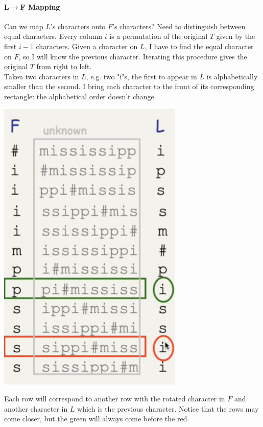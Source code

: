 \documentclass[10pt]{report}
\begin{document}
\paragraph{L$\rightarrow$F Mapping} Can we map $L$'s characters onto $F$'s characters? Need to distinguish between equal characters. Every column $i$ is a permutation of the original $T$ given by the first $i-1$ characters. Given a character on $L$, I have to find the equal character on $F$, so I will know the previous character. Iterating this procedure gives the original $T$ from right to left.\\
Taken two characters in $L$, e.g. two "i"s, the first to appear in $L$ is alphabetically smaller than the second. I bring each character to the front of its corresponding rectangle: the alphabetical order doesn't change.
\begin{center}
	\includegraphics[scale=0.5]{21.png}
\end{center}
Each row will correspond to another row with the rotated character in $F$ and another character in $L$ which is the previous character. Notice that the rows may come closer, but the green will always come before the red.
\end{document}
